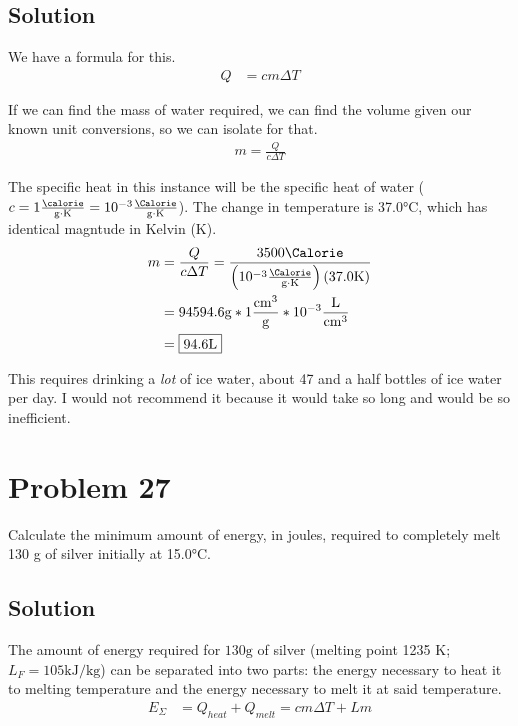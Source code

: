 \documentclass[12pt]{article}
\begin{document}
        \subsection{Solution}
            We have a formula for this. 
            \begin{align}
                Q   &=  cm \Delta T
            \end{align}

            If we can find the mass of water required, we can find the volume given our known unit conversions, so we can isolate for that.
            \begin{gather}
                m   =   \frac{Q}{c \Delta T}
            \end{gather}

            The specific heat in this instance will be the specific heat of water ($c = 1 \unit{\frac{\calorie}{\gram\cdot\kelvin}} = 10^{-3} \unit{\frac{\Calorie}{\gram\cdot\kelvin}}$). 
            The change in temperature is 37.0\unit{\celsius}, which has identical magntude in Kelvin (\unit{K}). 
            \begin{align}
                m   &=  \frac{Q}{c \Delta T}
                    =   \frac{3500\unit{\Calorie}}{\left( 10^{-3} \unit{\frac{\Calorie}{\gram\cdot\kelvin}} \right) \left( 37.0 \unit{\kelvin} \right)}\\
                    &=  94594.6 \unit{\gram} * 1 \unit{\frac{\centi\meter^3}{\gram}} * 10^{-3} \unit{\frac{\liter}{\centi\meter^3}}\\
                    &=  \boxed{94.6 \unit{\liter}}
            \end{align}

            This requires drinking a \textit{lot} of ice water, about 47 and a half bottles of ice water per day. 
            I would not recommend it because it would take so long and would be so inefficient. 

    \pagebreak
    \section{Problem 27}
        Calculate the minimum amount of energy, in joules, required to completely melt 130 g of silver initially at 15.0\unit{\celsius}.

        \subsection{Solution}
        The amount of energy required for $130 \unit{\gram}$ of silver (melting point 1235 \unit{\kelvin}; $L_F = 105 \unit{\kilo\joule/\kilo\gram}$) can be separated into two parts: the energy necessary to heat it to melting temperature and the energy necessary to melt it at said temperature.
        \begin{align}
            E_\Sigma    &=  Q_{heat} + Q_{melt}
                =   cm\Delta T + Lm
        \end{align}
\end{document}
